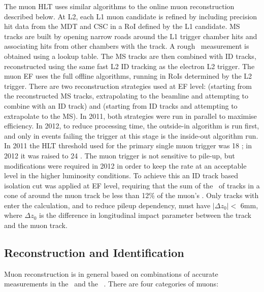 The muon HLT uses similar algorithms to the online muon reconstruction described
below. At L2, each L1 muon candidate is refined by including precision hit data
from the MDT and CSC in a RoI defined by the L1 candidate. MS tracks are
built by opening narrow roads around the L1 trigger chamber hits and associating
hits from other chambers with the track. A rough \pt\ measurement is obtained
using a lookup table. The MS tracks are then combined with ID tracks,
reconstructed using the same fast L2 ID tracking as the electron L2 trigger.
The muon EF uses the full offline algorithms,
running in RoIs determined by the L2 trigger. There are two reconstruction
strategies used at EF level:  (starting from the reconstructed
MS tracks, extrapolating to the beamline and attempting to combine with an ID
track) and  (starting from ID tracks and attempting to
extrapolate to the MS). In 2011, both strategies were run in parallel to
maximise efficiency. In 2012, to reduce processing time, the outside-in
algorithm is run first, and only in events failing the trigger at this stage is
the inside-out algorithm run. In 2011 the HLT threshold used for the primary
single muon trigger was 18 \GeV; in 2012 it was raised to 24 \GeV. The muon
trigger is not sensitive to pile-up, but modifications were required in 2012 in
order to keep the rate at an acceptable level in the higher luminosity
conditions. To achieve this an ID track based isolation cut was applied at EF level,
requiring that the sum of the \pt\ of tracks in a cone of  around
the muon track be less than 12\% of the muon's \pt. Only tracks with 
enter the calculation, and to reduce pileup dependency, must have $|\Delta
z_{0}| <$ 6mm, where $\Delta z_{0}$ is the difference in longitudinal impact
parameter between the track and the muon track.

\subsection{Reconstruction and Identification}
\label{sec:reco-mu-reco}

Muon reconstruction is in general based on combinations of accurate measurements
in the \ms\ and the \id~\cite{ATLAS-CONF-2010-064,ATLAS-CONF-2011-063}. There are four categories of
muons:

